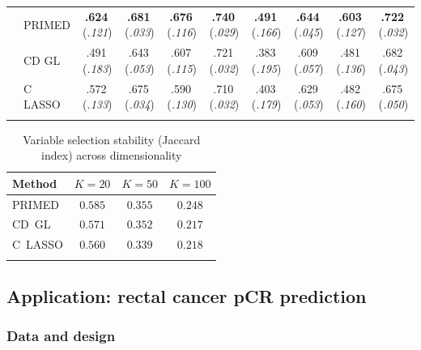 \documentclass[referee,lineno,pdflatex,sn-vancouver-num]{sn-jnl}
\begin{document}
\begin{table}[h]
\begin{tabular*}{\textwidth}{@{\extracolsep\fill}ll cccc cccc}
& PRIMED & \textbf{.624}\,(\textit{.121}) & \textbf{.681}\,(\textit{.033}) & \textbf{.676}\,(\textit{.116}) & \textbf{.740}\,(\textit{.029}) & \textbf{.491}\,(\textit{.166}) & \textbf{.644}\,(\textit{.045}) & \textbf{.603}\,(\textit{.127}) & \textbf{.722}\,(\textit{.032}) \\
& CD GL        & .491\,(\textit{.183}) & .643\,(\textit{.053}) & .607\,(\textit{.115}) & .721\,(\textit{.032}) & .383\,(\textit{.195}) & .609\,(\textit{.057}) & .481\,(\textit{.136}) & .682\,(\textit{.043}) \\
& C LASSO      & .572\,(\textit{.133}) & .675\,(\textit{.034}) & .590\,(\textit{.130}) & .710\,(\textit{.032}) & .403\,(\textit{.179}) & .629\,(\textit{.053}) & .482\,(\textit{.160}) & .675\,(\textit{.050}) \\
\botrule
\end{tabular*}
\end{table}

\begin{table}[h]
\caption{Variable selection stability (Jaccard index) across dimensionality}\label{tab:sim_jaccard}
\small
\renewcommand{\arraystretch}{1.1}
\begin{tabular*}{\textwidth}{@{\extracolsep\fill}lccc}
\toprule
Method & $K = 20$ & $K = 50$ & $K = 100$ \\
\midrule
PRIMED  & $\mathbf{0.585}$ & $\mathbf{0.355}$ & $\mathbf{0.248}$ \\
CD~GL   & $0.571$ & $0.352$ & $0.217$ \\
C~LASSO & $0.560$ & $0.339$ & $0.218$ \\
\botrule
\end{tabular*}
\end{table}


\subsection{Application: rectal cancer pCR prediction}\label{sec:application}

\subsubsection{Data and design}
\end{document}
